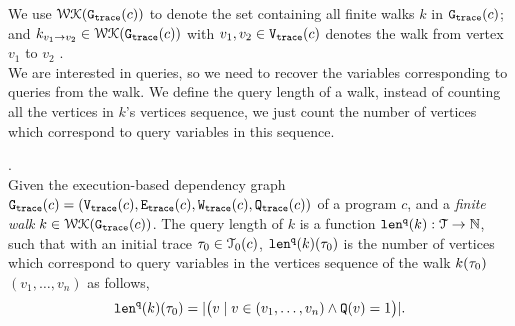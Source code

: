 We use $\mathcal{WK}(\mathtt{{G_{trace}}}(c))$ to denote 
the set containing all finite walks $k$ in $\mathtt{{G_{trace}}}(c)$;
and $k_{v_1 \to v_2} \in \mathcal{WK}(\mathtt{{G_{trace}}}(c))$ with $v_1, v_2 \in \mathtt{{V_{trace}}}(c)$ denotes the walk from vertex $v_1$ to $v_2$ . 
\\
We are interested in queries, so we need to recover the 
variables corresponding to queries from the walk. We define the query length of a walk, 
instead of counting all 
the vertices in $k$'s vertices sequence, we just count the number of vertices which correspond to query variables in this sequence.
%
\begin{defn}.
\label{def:qlen}
\\
Given 
the execution-based dependency graph $\mathtt{{G_{trace}}}({c}) = (\mathtt{{V_{trace}}}({c}), \mathtt{{E_{trace}}}({c}), \mathtt{{W_{trace}}}({c}), \mathtt{{Q_{trace}}}({c}))$ of a program $c$,
 and a \emph{finite walk} 
 $k \in \mathcal{WK}(\mathtt{{G_{trace}}}(c))$. 
The query length of $k$ is a function $\mathtt{len}^{\tt q}(k): \mathcal{T} \to \mathbb{N}$, such that with an initial trace  $\mathtt{\tau}_0 \in \mathcal{T}_0(c)$, $\mathtt{len}^{\tt q}(k)(\mathtt{\tau}_0)$ is
the number of vertices which correspond to query variables in the vertices sequence of the walk $k(\mathtt{\tau}_0)$
$(v_1, \ldots, v_{n})$ as follows, 
\[
  \mathtt{len}^{\tt q}(k)(\mathtt{\tau}_0) = |\big( v \mid v \in (v_1, \ldots, v_{n}) \land \mathtt{Q}(v) = 1 \big)|.
\]
\end{defn}
